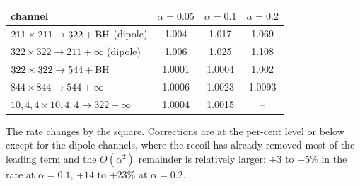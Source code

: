 \documentclass[11pt]{article}
\begin{document}
\begin{center}
\begin{tabular}{@{}lccc@{}}
\toprule
channel & $\alpha=0.05$ & $\alpha=0.1$ & $\alpha=0.2$ \\
\midrule
$211\times211\to322+{\rm BH}$ (dipole) & 1.004 & 1.017 & 1.069 \\
$322\times322\to211+\infty$ (dipole) & 1.006 & 1.025 & 1.108 \\
$322\times322\to544+{\rm BH}$ & 1.0001 & 1.0004 & 1.002 \\
$844\times844\to544+\infty$ & 1.0006 & 1.0023 & 1.0093 \\
$10{,}4{,}4\times10{,}4{,}4\to322+\infty$ & 1.0004 & 1.0015 & -- \\
\bottomrule
\end{tabular}
\end{center}
The rate changes by the square. Corrections are at the per-cent level or below except for the dipole channels, where the recoil has
already removed most of the leading term and the $O(\alpha^2)$ remainder is relatively larger: $+3$ to $+5\%$ in the rate at
$\alpha=0.1$, $+14$ to $+23\%$ at $\alpha=0.2$.
\end{document}
